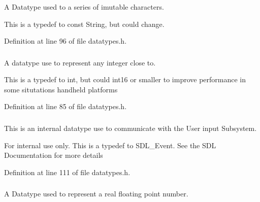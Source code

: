 A Datatype used to a series of imutable characters. 

This is a typedef to const String, but could change. 

Definition at line 96 of file datatypes.h.

\hypertarget{namespacephys_a7f09bf5585b2bb97613cd9aad4273a81}{
\subsubsection[{Integer}]{}}
\label{df/dec/namespacephys_a7f09bf5585b2bb97613cd9aad4273a81}


A datatype use to represent any integer close to. 

This is a typedef to int, but could int16 or smaller to improve performance in some situtations handheld platforms 

Definition at line 85 of file datatypes.h.

\hypertarget{namespacephys_a8126d26e4507e66d09876988bb941fd4}{
\subsubsection[{RawEvent}]{}}
\label{df/dec/namespacephys_a8126d26e4507e66d09876988bb941fd4}


This is an internal datatype use to communicate with the User input Subsystem. 

\begin{DoxyInternal}{For internal use only.}
This is a typedef to SDL\_\-Event. See the SDL Documentation for more details \end{DoxyInternal}


Definition at line 111 of file datatypes.h.

\hypertarget{namespacephys_af7eb897198d265b8e868f45240230d5f}{
\subsubsection[{Real}]{}}
\label{df/dec/namespacephys_af7eb897198d265b8e868f45240230d5f}


A Datatype used to represent a real floating point number. 

